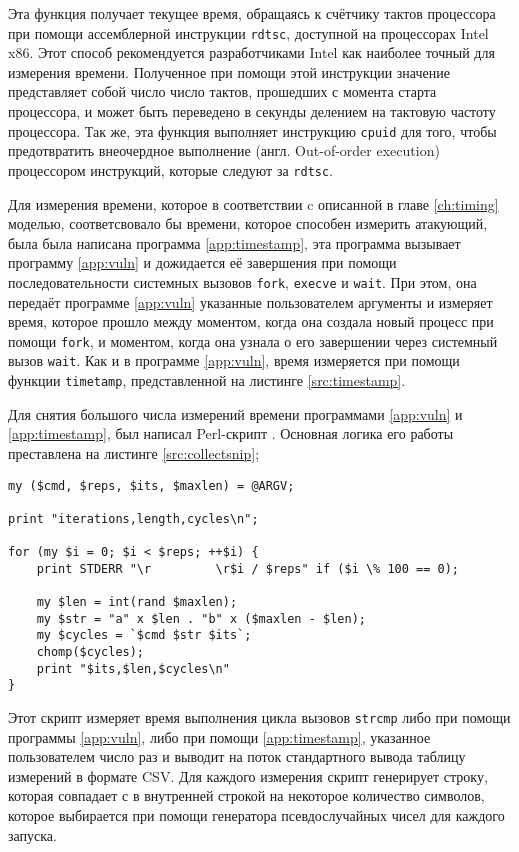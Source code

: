 Эта функция получает текущее время, обращаясь к счётчику тактов процессора при
помощи ассемблерной инструкции \texttt{rdtsc}, доступной на процессорах Intel x86.
Этот способ рекомендуется разработчиками Intel \cite{rdtsc} как наиболее точный для измерения
времени. Полученное при помощи этой инструкции значение представляет собой число
число тактов, прошедших с момента старта процессора, и может быть переведено в
секунды делением на тактовую частоту процессора. Так же, эта функция выполняет инструкцию
\texttt{cpuid} для того, чтобы предотвратить внеочердное выполнение
(англ. Out-of-order execution) процессором инструкций, которые следуют за \texttt{rdtsc}.

Для измерения времени, которое в соответствии c описанной в главе \ref{ch:timing}
моделью, соответсвовало бы времени, которое способен измерить атакующий, была
была написана программа \ref{app:timestamp}, эта программа вызывает программу
\ref{app:vuln} и дожидается её завершения при помощи последовательности системных
вызовов \texttt{fork}, \texttt{execve} и \texttt{wait}. При этом, она передаёт
программе \ref{app:vuln} указанные пользователем аргументы и измеряет время, которое
прошло между моментом, когда она создала новый процесс при помощи \texttt{fork},
и моментом, когда она узнала о его завершении через системный вызов \texttt{wait}.
Как и в программе \ref{app:vuln}, время измеряется при помощи функции \texttt{timetamp},
представленной на листинге \ref{src:timestamp}.

Для снятия большого числа измерений времени программами \ref{app:vuln} и
\ref{app:timestamp}, был написал Perl-скрипт . Основная логика его
работы преставлена на листинге \ref{src:collectsnip};

\begin{lstlisting}[caption=Фрагмент скрипта \texttt{collect.pl}, label=src:collectsnip]
my ($cmd, $reps, $its, $maxlen) = @ARGV;

print "iterations,length,cycles\n";

for (my $i = 0; $i < $reps; ++$i) {
	print STDERR "\r         \r$i / $reps" if ($i \% 100 == 0);

	my $len = int(rand $maxlen);
	my $str = "a" x $len . "b" x ($maxlen - $len);
	my $cycles = `$cmd $str $its`;
	chomp($cycles);
	print "$its,$len,$cycles\n"
}
\end{lstlisting}

Этот скрипт измеряет время выполнения цикла вызовов \texttt{strcmp} либо при помощи
программы \ref{app:vuln}, либо при помощи \ref{app:timestamp}, указанное пользователем
число раз и выводит на поток стандартного вывода таблицу измерений в формате CSV.
Для каждого измерения скрипт генерирует строку, которая совпадает с в внутренней строкой 
 на некоторое количество символов, которое выбирается при помощи генератора
псевдослучайных чисел для каждого запуска.

